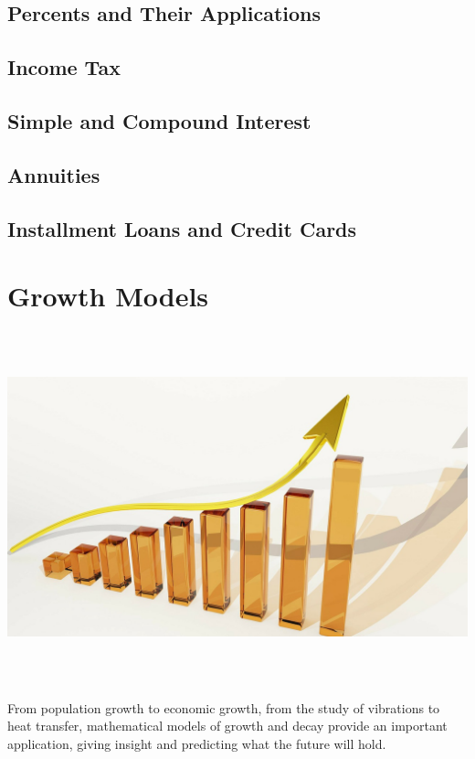\documentclass[9pt,letter,twoside,openright]{memoir}
\begin{document}
\section{Percents and Their Applications}


\section{Income Tax}


\section{Simple and Compound Interest}


\section{Annuities}


\section{Installment Loans and Credit Cards}


\chapter{Growth Models}
\begin{center}\includegraphics[width=\textwidth, height=4in]{Growth1}\end{center}
From population growth to economic growth, from the study of vibrations to heat transfer, mathematical models of growth and decay provide an important application, giving insight and predicting what the future will hold.
\end{document}
